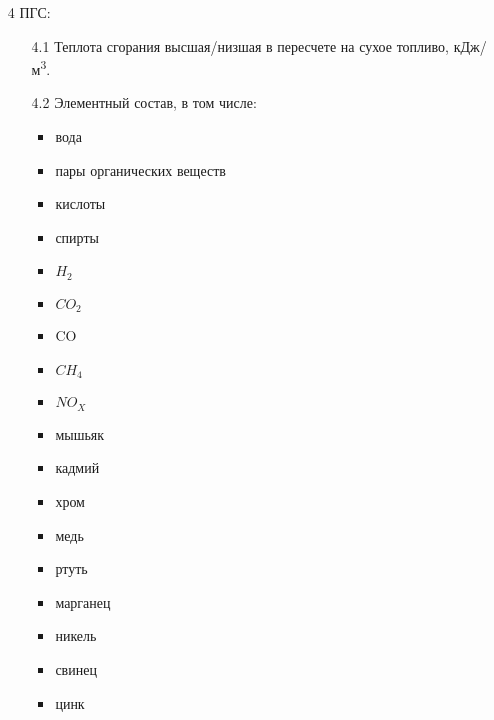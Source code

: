 \documentclass[russian,utf8]{eskdtext}
\begin{document}
\begin{enumerate}
   \item[4] ПГС:
      \begin{enumerate}
      \item[4.1] Теплота сгорания высшая/низшая в пересчете на сухое топливо, кДж/м\textsuperscript{3}.
      \item[4.2] Элементный состав, в том числе:
      \begin{itemize}
      \item вода
      \item пары органических веществ
      \item кислоты
      \item спирты 
      \item $H_{2}$
      \item $CO_{2}$
      \item CO
      \item $CH_{4}$
      \item $NO_{X}$
      \item мышьяк
      \item кадмий
      \item хром
      \item медь
      \item ртуть
      \item марганец
      \item никель
      \item свинец
      \item цинк
         \end{itemize}
      \end{enumerate}
      

\end{enumerate}
\end{document}
